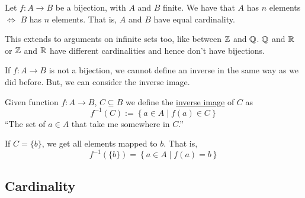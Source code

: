 \begin{remark}
    Let $f: A\to B$ be a bijection, with $A$ and $B$ finite. We have that $A$ has $n$ elements $\iff$ $B$ has $n$ elements. That is, $A$ and $B$ have equal cardinality.

    This extends to arguments on infinite sets too, like between $\mathbb Z$ and $\mathbb Q$. $\mathbb Q$ and $\mathbb R$ or $\mathbb Z$ and $\mathbb R$ have different cardinalities and hence don't have bijections.
\end{remark}

If $f: A\to B$ is not a bijection, we cannot define an inverse in the same way as we did before. But, we can consider the inverse image.

\begin{definition}
    Given function $f: A\to B$, $C\subseteq B$ we define the \ul{inverse image} of $C$ as
    \[f^{-1}(C) := \left\{ a\in A\mid f(a)\in C \right\}\]
    ``The set of $a\in A$ that take me somewhere in $C$.''
\end{definition}

If $C = \{b\}$, we get all elements mapped to $b$. That is,
\[f^{-1}(\{b\}) = \left\{ a\in A\mid f(a) = b \right\}\]

\subsection{Cardinality}
